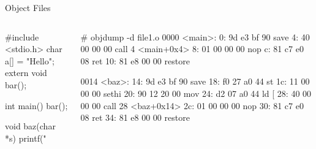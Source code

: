 \documentclass{plt}
\begin{document}
\begin{frame}[fragile]{Object Files}


\begin{columns}
  \begin{column}{0.3\textwidth}

\begin{C}
#include <stdio.h>
char a[] = "Hello";
extern void bar();

int main() {
  bar();
}

void baz(char *s) {
  printf("%
}
\end{C}
  \end{column}
  \begin{column}{0.7\textwidth}
\fontsize{10}{10}\selectfont
\begin{semiverbatim}
# objdump -d file1.o
0000 <main>:
 0: 9d e3 bf 90 save  %
 4: 40 00 00 00 call  4 <main+0x4>
 8: 01 00 00 00 nop 
 c: 81 c7 e0 08 ret 
10: 81 e8 00 00 restore 
	       
0014 <baz>:    
14: 9d e3 bf 90 save  %
18: f0 27 a0 44 st  %
1c: 11 00 00 00 sethi  %
20: 90 12 20 00 mov  %
24: d2 07 a0 44 ld  [ %
28: 40 00 00 00 call  28 <baz+0x14>
2c: 01 00 00 00 nop 
30: 81 c7 e0 08 ret 
34: 81 e8 00 00 restore
\end{semiverbatim}
  \end{column}
\end{columns}

\end{frame}
\end{document}
